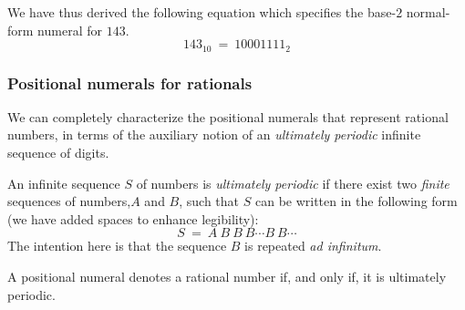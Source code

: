 \medskip

\noindent
We have thus derived the following equation which specifies the
base-$2$ normal-form numeral for $143$.
\[ 143_{10} \ = \ 10001111_2 \]


\subsubsection{Positional numerals for rationals}
\label{sec:special-numerals-Q}

We can completely characterize the positional numerals that represent
rational numbers, in terms of the auxiliary notion of an {\em ultimately
  periodic} infinite sequence of digits.

An infinite sequence $S$ of numbers is {\em ultimately periodic} if
there exist two {\em finite} sequences of numbers,$A$ and $B$, such
that $S$ can be written in the following form (we have added spaces to
enhance legibility):
\begin{equation}
\label{eq:ult-per-seq}
 S \ = \ A \ B \ B \ B \cdots B \ B \cdots
\end{equation}
The intention here is that the sequence $B$ is repeated {\it ad
  infinitum}.


\begin{prop}
\label{thm:rational-real}
A positional numeral denotes a rational number if, and only if, it is
ultimately periodic.
\end{prop}

